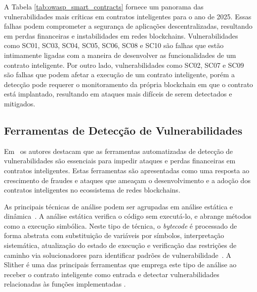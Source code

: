 \documentclass[12pt]{article}
\begin{document}
A Tabela \ref{tab:owasp_smart_contracts} fornece um panorama das vulnerabilidades mais críticas em contratos inteligentes para o ano de 2025. Essas falhas podem comprometer a segurança de aplicações descentralizadas, resultando em perdas financeiras e instabilidades em redes blockchains. Vulnerabilidades como SC01, SC03, SC04, SC05, SC06, SC08 e SC10 são falhas que estão intimamente ligadas com a maneira de desenvolver as funcionalidades de um contrato inteligente. Por outro lado, vulnerabilidades como SC02, SC07 e SC09 são falhas que podem afetar a execução de um contrato inteligente, porém a detecção pode requerer o monitoramento da própria blockchain em que o contrato está implantado, resultando em ataques mais difíceis de serem detectados e mitigados.

\subsection{Ferramentas de Detecção de Vulnerabilidades}\label{subsec:tools}




Em~\cite{khan2024survey} os autores destacam que as ferramentas automatizadas de detecção de vulnerabilidades são essenciais para impedir ataques e perdas financeiras em contratos inteligentes. Estas ferramentas são apresentadas como uma resposta ao crescimento de fraudes e ataques que ameaçam o desenvolvimento e a adoção dos contratos inteligentes no ecossistema de redes blockchains.

As principais técnicas de análise podem ser agrupadas em análise estática e dinâmica~\cite{praitheeshan2019security}. A análise estática verifica o código sem executá-lo, e abrange métodos como a execução simbólica. Neste tipo de técnica, o \textit{bytecode} é processado de forma abstrata com substituição de variáveis por símbolos, interpretação sistemática, atualização do estado de execução e verificação das restrições de caminho via solucionadores para identificar padrões de vulnerabilidade~\cite{qian2022smart, rameder2022review}. A Slither é uma das principais ferramentas que emprega este tipo de análise ao receber o contrato inteligente como entrada e detectar vulnerabilidades relacionadas às funções implementadas \cite{feist2019slither}.
\end{document}
